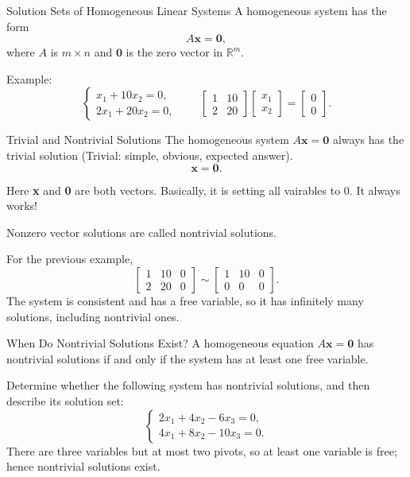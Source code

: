\begin{frame}{Solution Sets of Homogeneous Linear Systems}
  A \alert{homogeneous system} has the form
  \[
    A\mathbf{x}=\mathbf{0},
  \]
  where $A$ is $m\times n$ and $\mathbf{0}$ is the zero vector in
  $\mathbb{R}^m$.

  \medskip
  Example:
  \[
    \begin{cases}
      x_1+10x_2=0,\\
      2x_1+20x_2=0,
    \end{cases}
    \qquad
    \begin{bmatrix}1&10\\2&20\end{bmatrix}
    \begin{bmatrix}x_1\\x_2\end{bmatrix}
    =\begin{bmatrix}0\\0\end{bmatrix}.
  \]
\end{frame}

\begin{frame}{Trivial and Nontrivial Solutions}
  The homogeneous system $A\mathbf{x}=\mathbf{0}$ always has the
  \alert{trivial solution} (Trivial: simple, obvious, expected answer).
  \[
    \mathbf{x}=\mathbf{0}.
  \]

  Here \textbf{x} and \textbf{0} are both vectors. Basically, it is setting all vairables to 0. It always works!

  Nonzero vector solutions are called \alert{nontrivial solutions}.

  \medskip
  For the previous example,
  \[
    \left[\begin{array}{cc|c}1&10&0\\2&20&0\end{array}\right]
    \sim
    \left[\begin{array}{cc|c}1&10&0\\0&0&0\end{array}\right].
  \]
  The system is consistent and has a free variable, so it has infinitely
  many solutions, including nontrivial ones.
\end{frame}

\begin{frame}{When Do Nontrivial Solutions Exist?}
  A homogeneous equation $A\mathbf{x}=\mathbf{0}$ has nontrivial solutions
  if and only if the system has \alert{at least one free variable}.

  \medskip
  Determine whether the following system has nontrivial solutions, and then
  describe its solution set:
  \[
    \begin{cases}
      2x_1+4x_2-6x_3=0,\\
      4x_1+8x_2-10x_3=0.
    \end{cases}
  \]
  There are three variables but at most two pivots, so at least one variable
  is free; hence nontrivial solutions exist.
\end{frame}

